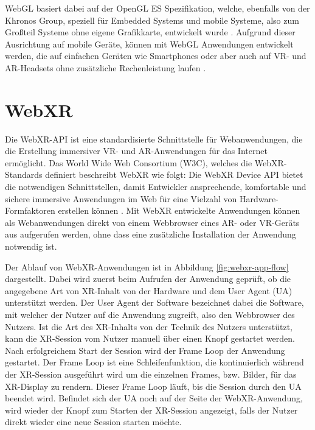 WebGL basiert dabei auf der OpenGL ES Spezifikation, welche, ebenfalls von der Khronos Group, speziell für Embedded Systems und mobile Systeme, also zum Großteil Systeme ohne eigene Grafikkarte, entwickelt wurde \autocite[]{khronos-opengles}.
Aufgrund dieser Ausrichtung auf mobile Geräte, können mit WebGL Anwendungen entwickelt werden, die auf einfachen Geräten wie Smartphones oder aber auch auf VR- und AR-Headsets ohne zusätzliche Rechenleistung laufen \autocite[][S.3]{Baruah2021}.


\section{WebXR}
\label{section:webxr}

Die WebXR-API ist eine standardisierte Schnittstelle für Webanwendungen, die die Erstellung immersiver VR- und AR-Anwendungen für das Internet ermöglicht.
Das World Wide Web Consortium (W3C), welches die WebXR-Standards definiert beschreibt WebXR wie folgt: \glqq{}Die WebXR Device API bietet die notwendigen Schnittstellen, damit Entwickler ansprechende, komfortable und sichere immersive Anwendungen im Web für eine Vielzahl von Hardware-Formfaktoren erstellen können\grqq{} \autocite[aus dem Englischen mit DeepL ][1. Introduction]{w3c_webxr}.
Mit WebXR entwickelte Anwendungen können als Webanwendungen direkt von einem Webbrowser eines AR- oder VR-Geräts aus aufgerufen werden, ohne dass eine zusätzliche Installation der Anwendung notwendig ist.

Der Ablauf von WebXR-Anwendungen ist in Abbildung \ref{fig:webxr-app-flow} dargestellt.
Dabei wird zuerst beim Aufrufen der Anwendung geprüft, ob die angegebene Art von XR-Inhalt von der Hardware und dem User Agent (UA) unterstützt werden.
Der User Agent der Software bezeichnet dabei die Software, mit welcher der Nutzer auf die Anwendung zugreift, also den Webbrowser des Nutzers. 
Ist die Art des XR-Inhalts von der Technik des Nutzers unterstützt, kann die XR-Session vom Nutzer manuell über einen Knopf gestartet werden.
Nach erfolgreichem Start der Session wird der Frame Loop der Anwendung gestartet.
Der Frame Loop ist eine Schleifenfunktion, die kontinuierlich während der XR-Session ausgeführt wird um die einzelnen Frames, bzw. Bilder, für das XR-Display zu rendern.
Dieser Frame Loop läuft, bis die Session durch den UA beendet wird.
Befindet sich der UA noch auf der Seite der WebXR-Anwendung, wird wieder der Knopf zum Starten der XR-Session angezeigt, falls der Nutzer direkt wieder eine neue Session starten möchte.

